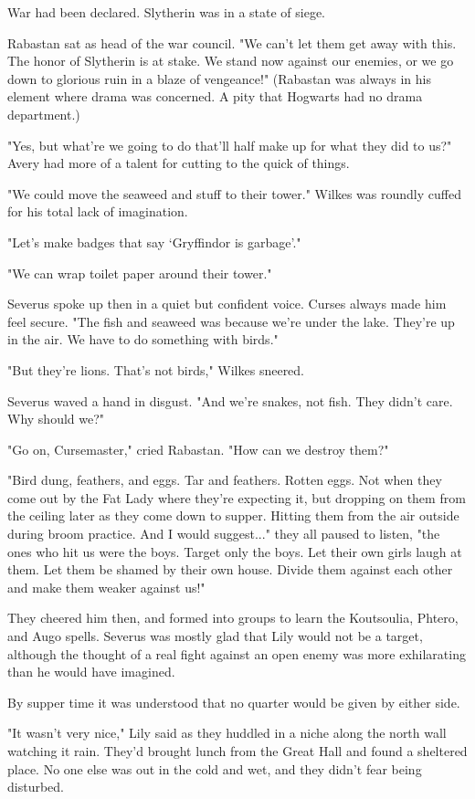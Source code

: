 \documentclass[a4paper,11pt]{article}
\begin{document}
War had been declared. Slytherin was in a state of siege.

Rabastan sat as head of the war council. "We can't let them get away with this. The honor of Slytherin is at stake. We stand now against our enemies, or we go down to glorious ruin in a blaze of vengeance!" (Rabastan was always in his element where drama was concerned. A pity that Hogwarts had no drama department.)

"Yes, but what're we going to do that'll half make up for what they did to us?" Avery had more of a talent for cutting to the quick of things.

"We could move the seaweed and stuff to their tower." Wilkes was roundly cuffed for his total lack of imagination.

"Let's make badges that say `Gryffindor is garbage'."

"We can wrap toilet paper around their tower."

Severus spoke up then in a quiet but confident voice. Curses always made him feel secure. "The fish and seaweed was because we're under the lake. They're up in the air. We have to do something with birds."

"But they're lions. That's not birds," Wilkes sneered.

Severus waved a hand in disgust. "And we're snakes, not fish. They didn't care. Why should we?"

"Go on, Cursemaster," cried Rabastan. "How can we destroy them?"

"Bird dung, feathers, and eggs. Tar and feathers. Rotten eggs. Not when they come out by the Fat Lady where they're expecting it, but dropping on them from the ceiling later as they come down to supper. Hitting them from the air outside during broom practice. And I would suggest..." they all paused to listen, "the ones who hit us were the boys. Target only the boys. Let their own girls laugh at them. Let them be shamed by their own house. Divide them against each other and make them weaker against us!"

They cheered him then, and formed into groups to learn the Koutsoulia, Phtero, and Augo spells. Severus was mostly glad that Lily would not be a target, although the thought of a real fight against an open enemy was more exhilarating than he would have imagined.

By supper time it was understood that no quarter would be given by either side.

"It wasn't very nice," Lily said as they huddled in a niche along the north wall watching it rain. They'd brought lunch from the Great Hall and found a sheltered place. No one else was out in the cold and wet, and they didn't fear being disturbed.
\end{document}

